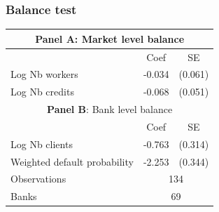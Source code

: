 \documentclass[aspectratio=169]{beamer}
\begin{document}

\begin{frame}[noframenumbering]
\frametitle{\textbf{Balance test}} \label{balance}

\begin{center}
    \footnotesize
    \begin{tabular}{lcc}
        \toprule
        \multicolumn{3}{c}{\textbf{Panel A}: Market level balance} \\
        \midrule
         & Coef & SE \\
        \midrule
        Log Nb workers & -0.034  & (0.061)  \\
        Log Nb credits & -0.068  & (0.051)  \\
        \midrule
        \multicolumn{3}{c}{\textbf{Panel B}: Bank level balance} \\
        \midrule
         & Coef & SE \\
        \midrule
        Log Nb clients & -0.763  & (0.314)  \\
        Weighted default probability & -2.253  & (0.344)  \\
        \midrule
        Observations & \multicolumn{2}{c}{134} \\
        Banks & \multicolumn{2}{c}{69} \\
        \bottomrule
    \end{tabular}
\end{center}

\hyperlink{main_result}{}

\end{frame}

\end{document}
